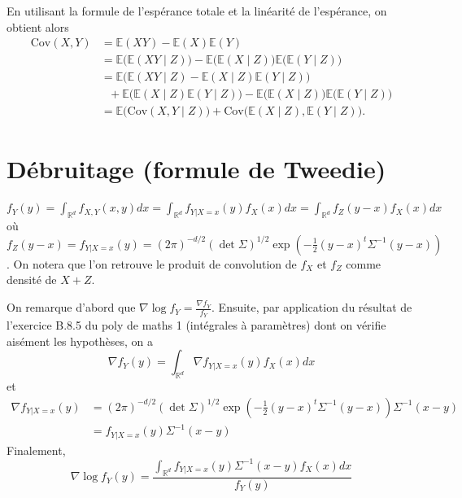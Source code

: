 En utilisant la formule de l'espérance totale et la linéarité de
l'espérance, on obtient alors \begin{align*}
\text{Cov}(X,Y) &= \mathbb{E}(XY) - \mathbb{E}(X)\mathbb{E}(Y)\\
&= \mathbb{E}\bigl( \mathbb{E}(XY \mid Z) \bigr) - \mathbb{E}\bigl( \mathbb{E}(X \mid Z) \bigr)\mathbb{E}\bigl( \mathbb{E}(Y \mid Z) \bigr)\\
&= \mathbb{E}\bigl( \mathbb{E}(XY \mid Z) - \mathbb{E}(X\mid Z)\mathbb{E}(Y\mid Z) \bigr)\\
&\ \ \  + \mathbb{E}\bigl( \mathbb{E}(X\mid Z)\mathbb{E}(Y\mid Z) \bigr) - \mathbb{E}\bigl( \mathbb{E}(X \mid Z) \bigr)\mathbb{E}\bigl( \mathbb{E}(Y \mid Z) \bigr)\\
&= \mathbb{E}\bigl(\text{Cov}(X,Y\mid Z)\bigr) + \text{Cov}\bigl( \mathbb{E}(X\mid Z), \mathbb{E}(Y\mid Z) \bigr).
\end{align*}

\section{Débruitage (formule de
Tweedie)}\label{III-duxe9bruitage-formule-de-tweedie-1}

\label{III-answer-tweedie1}
\(f_Y(y) = \int_{\mathbb{R}^d} f_{X,Y}(x,y) dx = \int_{\mathbb{R}^d} f_{Y|X=x}(y) f_X(x) dx = \int_{\mathbb{R}^d} f_Z(y-x) f_X(x) dx\)
où
\(f_Z(y-x) = f_{Y|X=x}(y) = (2 \pi)^{-d/2} (\det \Sigma)^{1/2}\exp\left(-\frac12 (y-x)^t\Sigma^{-1}(y-x)\right)\).
On notera que l'on retrouve le produit de convolution de \(f_X\) et
\(f_Z\) comme densité de \(X+Z\).

\label{III-answer-tweedie2}
On remarque d'abord que \(\nabla \log f_Y = \frac{\nabla f_Y}{f_Y}\).
Ensuite, par application du résultat de l'exercice B.8.5 du poly de
maths 1 (intégrales à paramètres) dont on vérifie aisément les
hypothèses, on a
\[\nabla f_Y(y) = \int_{\mathbb{R}^d} \nabla f_{Y|X=x}(y) f_X(x) dx\] et
\begin{align*}
\nabla f_{Y|X=x}(y) &= (2 \pi)^{-d/2} (\det \Sigma)^{1/2}\exp\left(-\frac12 (y-x)^t\Sigma^{-1}(y-x)\right) \Sigma^{-1}(x-y)\\
&= f_{Y|X=x}(y) \Sigma^{-1}(x-y)
\end{align*} Finalement,
\[\nabla \log f_Y(y) = \frac{\int_{\mathbb{R}^d} f_{Y|X=x}(y) \Sigma^{-1}(x-y) f_X(x) dx}{f_Y(y)}\]


